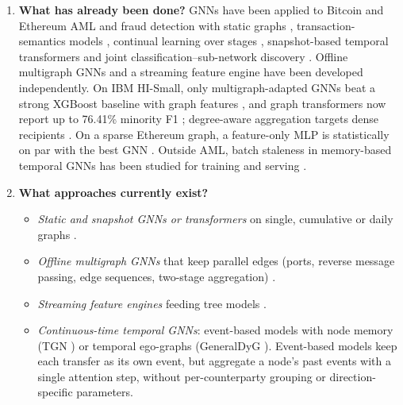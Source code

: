 \documentclass[11pt,a4paper]{article}
\begin{document}
\begin{enumerate}[leftmargin=*]
    \item \textbf{What has already been done?}
    GNNs have been applied to Bitcoin and Ethereum AML and fraud detection with static graphs \cite{ferretti2025aml,li2025tfgat,kasula2025ajk,alemari2026explainable}, transaction-semantics models \cite{jia2025lmae4eth}, continual learning over stages \cite{tian2025kar}, snapshot-based temporal transformers \cite{lin2026chronowave} and joint classification--sub-network discovery \cite{rico2026taml}. Offline multigraph GNNs \cite{egressy2024multigraph,ding2024diam,bilgi2026mega} and a streaming feature engine \cite{blanusa2024gfp} have been developed independently. On IBM HI-Small, only multigraph-adapted GNNs beat a strong XGBoost baseline with graph features \cite{egressy2024multigraph}, and graph transformers now report up to 76.41\% minority F1 \cite{lin2024fraudgt}; degree-aware aggregation targets dense recipients \cite{losavio2026saltgnn}. On a sparse Ethereum graph, a feature-only MLP is statistically on par with the best GNN \cite{alemari2026explainable}. Outside AML, batch staleness in memory-based temporal GNNs has been studied for training and serving \cite{su2024pres,zhou2025badgnn,anchorrm2026,streamtgn2026}.

    \item \textbf{What approaches currently exist?}
    \begin{itemize}[leftmargin=*]
        \item \textit{Static and snapshot GNNs or transformers} on single, cumulative or daily graphs \cite{ferretti2025aml,li2025tfgat,kasula2025ajk,lin2026chronowave,rico2026taml}.
        \item \textit{Offline multigraph GNNs} that keep parallel edges (ports, reverse message passing, edge sequences, two-stage aggregation) \cite{egressy2024multigraph,ding2024diam,bilgi2026mega}.
        \item \textit{Streaming feature engines} feeding tree models \cite{blanusa2024gfp}.
        \item \textit{Continuous-time temporal GNNs}: event-based models with node memory (TGN \cite{rossi2020tgn}) or temporal ego-graphs (GeneralDyG \cite{yang2025generaldyg}). Event-based models keep each transfer as its own event, but aggregate a node's past events with a single attention step, without per-counterparty grouping or direction-specific parameters.
    \end{itemize}


\end{enumerate}
\end{document}

